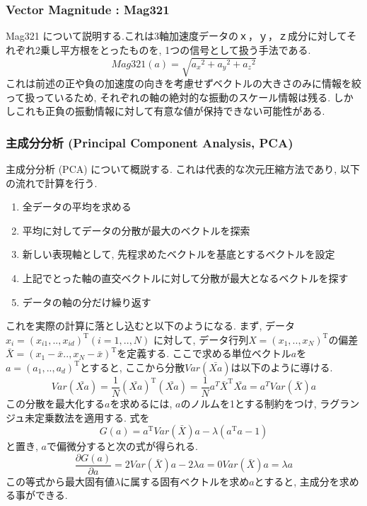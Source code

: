 \subsubsection{Vector Magnitude : Mag321}
Mag321 について説明する.これは3軸加速度データの$ｘ$，$ｙ$，$ｚ$成分に対してそれぞれ2乗し平方根をとったものを, 1つの信号として扱う手法である. 
\begin{equation}
Mag321(a)=\sqrt{{a_{x}}^2+{a_{y}}^2+{a_{z}}^2} 
\end{equation}
これは前述の正や負の加速度の向きを考慮せずベクトルの大きさのみに情報を絞って扱っているため, それぞれの軸の絶対的な振動のスケール情報は残る. しかしこれも正負の振動情報に対して有意な値が保持できない可能性がある.

\subsubsection{主成分分析 (Principal Component Analysis, PCA)}
主成分分析 (PCA) について概説する. これは代表的な次元圧縮方法であり, 以下の流れで計算を行う. 
\begin{enumerate}
  \item 全データの平均を求める
  \item 平均に対してデータの分散が最大のベクトルを探索
  \item 新しい表現軸として, 先程求めたベクトルを基底とするベクトルを設定
  \item 上記でとった軸の直交ベクトルに対して分散が最大となるベクトルを探す
  \item データの軸の分だけ繰り返す
\end{enumerate}
これを実際の計算に落とし込むと以下のようになる. 
まず, データ${x_{i} = (x_{i1}, .. , x_{id})^{\mathrm{T}}(i = 1, .. ,N)}$
に対して, データ行列${X = (x_{1}, .. ,x_{N})^{\mathrm{T}}}$の偏差${\bar{X}=(x_{1} - \bar{x} .. ,x_{N} - \bar{x})^{\mathrm{T}}}$を定義する. ここで求める単位ベクトル$a$を${a = (a_{1}, .. ,a_{d})^{\mathrm{T}}}$とすると, 
ここから分散$Var({\bar{Xa}})$は以下のように導ける. 
\begin{equation}
Var({\bar{Xa}}) = \frac{1}{N}(\bar{Xa})^{\mathrm{T}}(\bar{Xa}) = \frac{1}{N}{a}^T\bar{X}^{\mathrm{T}}\bar{Xa} = a^TVar({{\bar{X}}})a
\end{equation}
この分散を最大化する$a$を求めるには, $a$のノルムを1とする制約をつけ, ラグランジュ未定乗数法を適用する. 式を
\begin{equation}
{G(a) = a^{\mathrm{T}}Var({{\bar{X}}})a - \lambda(a^{\mathrm{T}} a - 1)} 
\end{equation}
と置き, $a$で偏微分すると次の式が得られる. 
\begin{equation}
{\frac{\partial G(a)}{\partial a} = 2 Var({{\bar{X}}})a - 2\lambda a = 0}
{Var (\bar{X})a = \lambda a}
\end{equation}
この等式から最大固有値$\lambda$に属する固有ベクトルを求め$a$とすると, 主成分を求める事ができる. 

